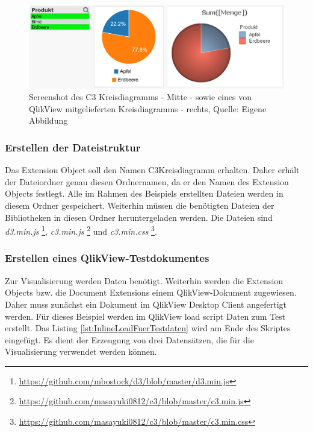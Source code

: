 \begin{figure}
	\centering
		\includegraphics[width=1.00\textwidth]{img/KreisdiagrammScreenshot/Vergleich.PNG}
	\caption[Screenshot des C3 Kreisdiagramms]{Screenshot des C3 Kreisdiagramms - Mitte - sowie eines von QlikView mitgelieferten Kreisdiagramms - rechts, Quelle: Eigene Abbildung}
	\label{fig:Vergleich}
\end{figure}

\subsubsection{Erstellen der Dateistruktur}

Das Extension Object soll den Namen C3Kreisdiagramm erhalten. Daher erhält der Datei\-ordner genau diesen Ordner\-namen, da er den Namen des Extension Objects festlegt. Alle im Rahmen des Beispiels erstellten Dateien werden in diesem Ordner gespeichert. Weiterhin müssen die benötigten Dateien der Bibliotheken in diesen Ordner heruntergeladen werden. Die Dateien sind \textit{d3.min.js} \footnote{\url{https://github.com/mbostock/d3/blob/master/d3.min.js}}, \textit{c3.min.js} \footnote{\url{https://github.com/masayuki0812/c3/blob/master/c3.min.js}} und \textit{c3.min.css} \footnote{\url{https://github.com/masayuki0812/c3/blob/master/c3.min.css}}.

\subsubsection{Erstellen eines QlikView-Testdokumentes}
\label{lab:ErstellenEinesQlikViewTestdokumentes} 

Zur Visualisierung werden Daten benötigt. Weiterhin werden die Extension Objects bzw. die Document Extensions einem QlikView-Dokument zugewiesen. Daher muss zunächst ein Dokument im QlikView Desktop Client angefertigt werden. Für dieses Beispiel werden im QlikView load script Daten zum Test erstellt. Das Listing \ref{lst:InlineLoadFuerTestdaten} wird am Ende des Skriptes eingefügt. Es dient der Erzeugung von drei Daten\-sätzen, die für die Visualisierung verwendet werden können.

